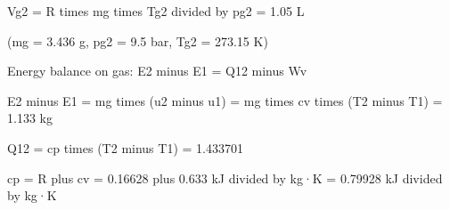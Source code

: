 Vg2 = R times mg times Tg2 divided by pg2  
= 1.05 L  

(mg = 3.436 g, pg2 = 9.5 bar, Tg2 = 273.15 K)  

Energy balance on gas:  
E2 minus E1 = Q12 minus Wv  

E2 minus E1 = mg times (u2 minus u1) = mg times cv times (T2 minus T1)  
= 1.133 kg  

Q12 = cp times (T2 minus T1) = 1.433701  

cp = R plus cv = 0.16628 plus 0.633 kJ divided by kg·K = 0.79928 kJ divided by kg·K